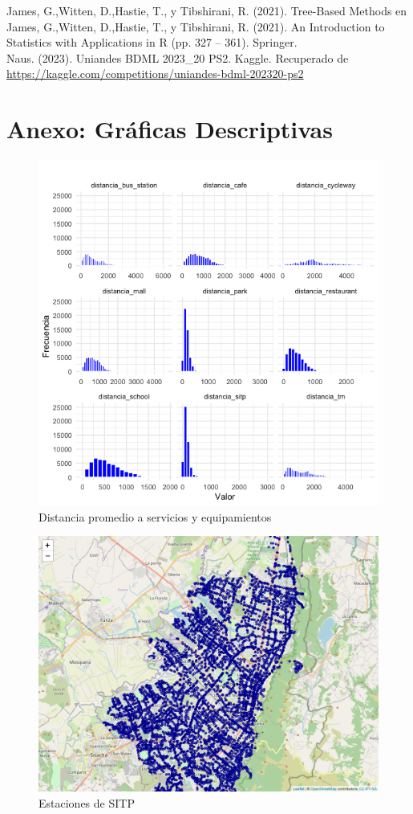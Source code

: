 \documentclass[12pt]{article}
\begin{document}
James, G.,Witten, D.,Hastie, T., y Tibshirani, R. (2021). Tree-Based Methods en James, G.,Witten, D.,Hastie, T., y Tibshirani, R. (2021).  An Introduction to Statistics with Applications in R (pp. 327 – 361). Springer.\\

Naus. (2023). Uniandes BDML 2023\_20 PS2. Kaggle. Recuperado de \url{https://kaggle.com/competitions/uniandes-bdml-202320-ps2}

\section{Anexo: Gráficas Descriptivas}

\begin{figure}[ht]
    \centering
    \includegraphics[scale=0.6]{../views/graficas_descriptivas/Histograma_distancias.png}
    \caption{Distancia promedio a servicios y equipamientos}
\end{figure}

\begin{figure}[ht]
    \centering
    \includegraphics[scale=0.50]{../views/mapas/sitp.png}
    \caption{Estaciones de SITP}
    \label{fig:mapasitp}
\end{figure}
\end{document}
